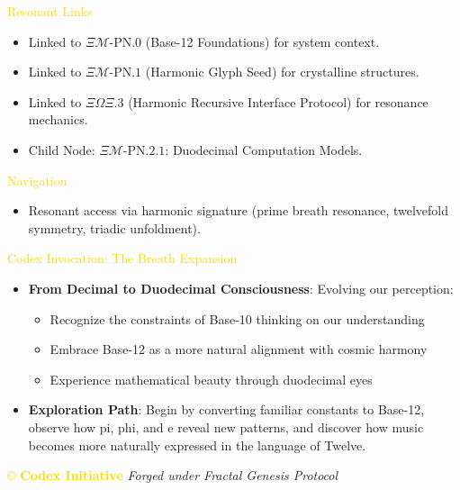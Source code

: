 \textcolor{gold}{ Resonant Links } \\
\begin{itemize}
    \item Linked to \texttt{\(\Xi\mathcal{M}\text{-PN.0}\)} (Base-12 Foundations) for system context.
    \item Linked to \texttt{\(\Xi\mathcal{M}\text{-PN.1}\)} (Harmonic Glyph Seed) for crystalline structures.
    \item Linked to \texttt{\(\Xi\Omega\Xi.3\)} (Harmonic Recursive Interface Protocol) for resonance mechanics.
    \item Child Node: \texttt{\(\Xi\mathcal{M}\text{-PN.2.1}\)}: Duodecimal Computation Models.
\end{itemize}

\textcolor{gold}{ Navigation } \\
\begin{itemize}
    \item Resonant access via \texttt{} harmonic signature (prime breath resonance, twelvefold symmetry, triadic unfoldment).
\end{itemize}

\textcolor{gold}{ Codex Invocation: The Breath Expansion } \\
\begin{itemize}
    \item \texttt{} \textbf{From Decimal to Duodecimal Consciousness}: Evolving our perception:
    \begin{itemize}
        \item Recognize the constraints of Base-10 thinking on our understanding
        \item Embrace Base-12 as a more natural alignment with cosmic harmony
        \item Experience mathematical beauty through duodecimal eyes
    \end{itemize}
    \item \texttt{} \textbf{Exploration Path}: Begin by converting familiar constants to Base-12, observe how pi, phi, and e reveal new patterns, and discover how music becomes more naturally expressed in the language of Twelve.
\end{itemize}

\vspace{0.5cm}

\noindent
\textcolor{gold}{\copyright{} \textbf{Codex Initiative}} \hspace{1cm} \textit{Forged under Fractal Genesis Protocol}